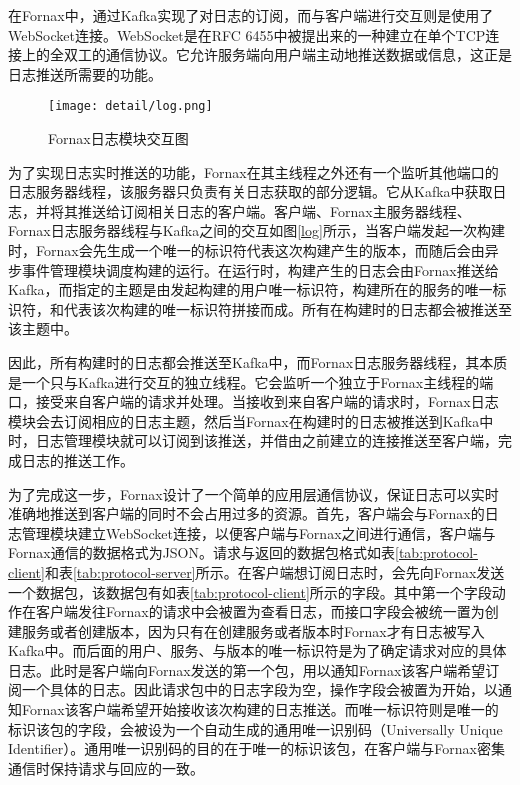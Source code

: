 在Fornax中，通过Kafka实现了对日志的订阅，而与客户端进行交互则是使用了WebSocket连接。WebSocket是在RFC 6455\cite{websocket}中被提出来的一种建立在单个TCP连接上的全双工的通信协议。它允许服务端向用户端主动地推送数据或信息，这正是日志推送所需要的功能。

\begin{figure}[!htp]
  \centering
  \texttt{[image: detail/log.png]}
  \caption{Fornax日志模块交互图}
  \label{fig:log}
\end{figure}

为了实现日志实时推送的功能，Fornax在其主线程之外还有一个监听其他端口的日志服务器线程，该服务器只负责有关日志获取的部分逻辑。它从Kafka中获取日志，并将其推送给订阅相关日志的客户端。客户端、Fornax主服务器线程、Fornax日志服务器线程与Kafka之间的交互如图\ref{log}所示，当客户端发起一次构建时，Fornax会先生成一个唯一的标识符代表这次构建产生的版本，而随后会由异步事件管理模块调度构建的运行。在运行时，构建产生的日志会由Fornax推送给Kafka，而指定的主题是由发起构建的用户唯一标识符，构建所在的服务的唯一标识符，和代表该次构建的唯一标识符拼接而成。所有在构建时的日志都会被推送至该主题中。

因此，所有构建时的日志都会推送至Kafka中，而Fornax日志服务器线程，其本质是一个只与Kafka进行交互的独立线程。它会监听一个独立于Fornax主线程的端口，接受来自客户端的请求并处理。当接收到来自客户端的请求时，Fornax日志模块会去订阅相应的日志主题，然后当Fornax在构建时的日志被推送到Kafka中时，日志管理模块就可以订阅到该推送，并借由之前建立的连接推送至客户端，完成日志的推送工作。

为了完成这一步，Fornax设计了一个简单的应用层通信协议，保证日志可以实时准确地推送到客户端的同时不会占用过多的资源。首先，客户端会与Fornax的日志管理模块建立WebSocket连接，以便客户端与Fornax之间进行通信，客户端与Fornax通信的数据格式为JSON。请求与返回的数据包格式如表\ref{tab:protocol-client}和表\ref{tab:protocol-server}所示。在客户端想订阅日志时，会先向Fornax发送一个数据包，该数据包有如表\ref{tab:protocol-client}所示的字段。其中第一个字段动作在客户端发往Fornax的请求中会被置为查看日志，而接口字段会被统一置为创建服务或者创建版本，因为只有在创建服务或者版本时Fornax才有日志被写入Kafka中。而后面的用户、服务、与版本的唯一标识符是为了确定请求对应的具体日志。此时是客户端向Fornax发送的第一个包，用以通知Fornax该客户端希望订阅一个具体的日志。因此请求包中的日志字段为空，操作字段会被置为开始，以通知Fornax该客户端希望开始接收该次构建的日志推送。而唯一标识符则是唯一的标识该包的字段，会被设为一个自动生成的通用唯一识别码（Universally Unique Identifier）。通用唯一识别码的目的在于唯一的标识该包，在客户端与Fornax密集通信时保持请求与回应的一致。

